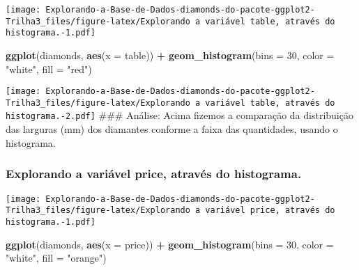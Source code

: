 \documentclass[
]{article}
\newenvironment{Shaded}{\begin{snugshade}}{\end{snugshade}}
\newcommand{\DataTypeTok}[1]{\textcolor[rgb]{0.13,0.29,0.53}{#1}}
\newcommand{\DecValTok}[1]{\textcolor[rgb]{0.00,0.00,0.81}{#1}}
\newcommand{\KeywordTok}[1]{\textcolor[rgb]{0.13,0.29,0.53}{\textbf{#1}}}
\newcommand{\NormalTok}[1]{#1}
\newcommand{\OperatorTok}[1]{\textcolor[rgb]{0.81,0.36,0.00}{\textbf{#1}}}
\newcommand{\StringTok}[1]{\textcolor[rgb]{0.31,0.60,0.02}{#1}}
\begin{document}
\texttt{[image: Explorando-a-Base-de-Dados-diamonds-do-pacote-ggplot2-Trilha3\_files/figure-latex/Explorando a variável table, através do histograma.-1.pdf]}

\begin{Shaded}
\begin{Highlighting}[]
\KeywordTok{ggplot}\NormalTok{(diamonds, }\KeywordTok{aes}\NormalTok{(}\DataTypeTok{x =}\NormalTok{ table)) }\OperatorTok{+}\StringTok{ }\KeywordTok{geom_histogram}\NormalTok{(}\DataTypeTok{bins =} \DecValTok{30}\NormalTok{, }\DataTypeTok{color =} \StringTok{"white"}\NormalTok{, }\DataTypeTok{fill =} \StringTok{"red"}\NormalTok{)}
\end{Highlighting}
\end{Shaded}

\texttt{[image: Explorando-a-Base-de-Dados-diamonds-do-pacote-ggplot2-Trilha3\_files/figure-latex/Explorando a variável table, através do histograma.-2.pdf]}
\#\#\# Análise: Acima fizemos a comparação da distribuição das larguras
(mm) dos diamantes conforme a faixa das quantidades, usando o
histograma.

\hypertarget{explorando-a-variuxe1vel-price-atravuxe9s-do-histograma.}{%
\subsubsection{Explorando a variável price, através do
histograma.}\label{explorando-a-variuxe1vel-price-atravuxe9s-do-histograma.}}

\begin{Shaded}
\end{Shaded}

\texttt{[image: Explorando-a-Base-de-Dados-diamonds-do-pacote-ggplot2-Trilha3\_files/figure-latex/Explorando a variável price, através do histograma.-1.pdf]}

\begin{Shaded}
\begin{Highlighting}[]
\KeywordTok{ggplot}\NormalTok{(diamonds, }\KeywordTok{aes}\NormalTok{(}\DataTypeTok{x =}\NormalTok{ price)) }\OperatorTok{+}\StringTok{ }\KeywordTok{geom_histogram}\NormalTok{(}\DataTypeTok{bins =} \DecValTok{30}\NormalTok{, }\DataTypeTok{color =} \StringTok{"white"}\NormalTok{, }\DataTypeTok{fill =} \StringTok{"orange"}\NormalTok{)}
\end{Highlighting}
\end{Shaded}
\end{document}

